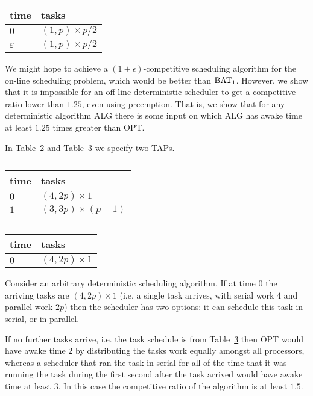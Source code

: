 \begin{table}[H]
\caption{}
\label{tab:2minusEps}
\centering
\begin{tabular}{|l|l|}
\hline
time & tasks                    \\ \hline
$0$  & $(1,p) \times p/2$       \\ \hline
$\varepsilon$  & $(1, p) \times p/2$ \\ \hline
\end{tabular}
\end{table}

We might hope to achieve a $(1+\epsilon)$-competitive scheduling
algorithm for the on-line scheduling problem, which would be
better than $\operatorname{\text{BAT}}_1$. However, we show that it is impossible
for an off-line deterministic scheduler to get a competitive
ratio lower than $1.25$, even using preemption. That is, we show
that for any deterministic algorithm ALG there is some input on
which ALG has awake time at least $1.25$ times greater than OPT. 

In Table~\ref{tab:lowerboundFork1} and
Table~\ref{tab:lowerboundFork2} we specify two TAPs.

\begin{table}[H]
\caption{}
\label{tab:lowerboundFork1}
\centering
\begin{tabular}{|l|l|}
\hline
time & tasks                    \\ \hline
$0$  & $(4, 2p) \times 1$       \\ \hline
$1$  & $(3, 3p) \times (p-1)$ \\ \hline
\end{tabular}
\end{table}

\begin{table}[H]
\caption{}
\label{tab:lowerboundFork2}
\centering
\begin{tabular}{|l|l|}
\hline
time & tasks                    \\ \hline
$0$  & $(4, 2p) \times 1$       \\ \hline
\end{tabular}
\end{table}

Consider an arbitrary deterministic scheduling algorithm. If at
time $0$ the arriving tasks are $(4, 2p)\times 1$ (i.e. a single
task arrives, with serial work $4$ and parallel work $2p$) then
the scheduler has two options: it can schedule this task in
serial, or in parallel.

If no further tasks arrive, i.e. the task schedule is from
Table~\ref{tab:lowerboundFork2} then OPT would have awake time
$2$ by distributing the tasks work equally amongst all
processors, whereas a scheduler that ran the task in serial for
all of the time that it was running the task during the first
second after the task arrived would have awake time at least $3$.
In this case the competitive ratio of the algorithm is at least $1.5$.

